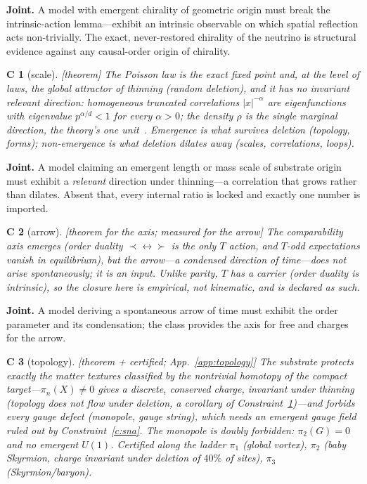 \documentclass[aps,prd,reprint,nofootinbib,superscriptaddress,floatfix]{revtex4-2}
\newtheorem{constraint}{C}
\begin{document}
\noindent\textbf{Joint.} A model with emergent chirality of geometric origin must break the
intrinsic-action lemma---exhibit an intrinsic observable on which spatial reflection acts
non-trivially. The exact, never-restored chirality of the neutrino is structural evidence
against any causal-order origin of chirality.

\begin{constraint}[scale]
\label{c:scale}
{\rm[theorem]} The Poisson law is the exact fixed point and, at the level of laws, the global
attractor of thinning (random deletion), and it has no invariant relevant direction: homogeneous
truncated correlations $|x|^{-\alpha}$ are eigenfunctions with eigenvalue $p^{\alpha/d}<1$ for
every $\alpha>0$; the density $\rho$ is the single marginal direction, the theory's one
unit~\cite{CorePaper}. Emergence is what survives deletion (topology, forms); non-emergence is
what deletion dilates away (scales, correlations, loops).
\end{constraint}

\noindent\textbf{Joint.} A model claiming an emergent length or mass scale of substrate origin
must exhibit a \emph{relevant} direction under thinning---a correlation that grows rather than
dilates. Absent that, every internal ratio is locked and exactly one number is imported.

\begin{constraint}[arrow]
\label{c:arrow}
{\rm[theorem for the axis; measured for the arrow]} The comparability \emph{axis} emerges
(order duality $\prec\leftrightarrow\succ$ is the only $T$ action, and $T$-odd expectations
vanish in equilibrium), but the \emph{arrow}---a condensed direction of time---does not arise
spontaneously; it is an input. Unlike parity, $T$ has a carrier (order duality is intrinsic),
so the closure here is empirical, not kinematic, and is declared as such.
\end{constraint}

\noindent\textbf{Joint.} A model deriving a spontaneous arrow of time must exhibit the order
parameter and its condensation; the class provides the axis for free and charges for the arrow.

\begin{constraint}[topology]
\label{c:topology}
{\rm[theorem + certified; App.~\ref{app:topology}]} The substrate protects exactly the \emph{matter textures}
classified by the nontrivial homotopy of the compact target---$\pi_n(X)\neq0$ gives a
discrete, conserved charge, invariant under thinning (topology does not flow under deletion,
a corollary of Constraint~\ref{c:scale})---and forbids every \emph{gauge defect} (monopole,
gauge string), which needs an emergent gauge field ruled out by Constraint~\ref{c:sna}. The
monopole is doubly forbidden: $\pi_2(G)=0$ and no emergent $U(1)$. Certified along the ladder
$\pi_1$ (global vortex), $\pi_2$ (baby Skyrmion, charge invariant under deletion of $40\%$ of
sites), $\pi_3$ (Skyrmion/baryon).
\end{constraint}
\end{document}
